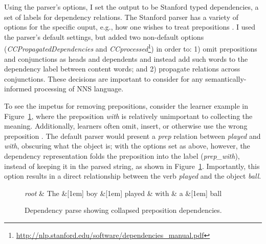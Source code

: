 Using the parser's options, I set the output to be Stanford typed dependencies, a set of labels for dependency relations. The Stanford parser has a variety of options for the specific ouput, e.g., how one wishes to treat prepositions \citep{defmarneffe:manning:12}.  I used the parser's default settings, but added two non-default options (\textit{CCPropagatedDependencies} and \textit{CCprocessed}\footnote{\url{http://nlp.stanford.edu/software/dependencies_manual.pdf}}) in order to: 1) omit prepositions and conjunctions as heads and dependents and instead add such words to the dependency label between content words; and 2) propagate relations across conjunctions.  These decisions are important to consider for any semantically-informed processing of NNS language.

To see the impetus for removing prepositions, consider the learner
example in Figure~\ref{fig:prep-dependency}, where the preposition \textit{with} is
relatively unimportant to collecting the meaning.  Additionally,
learners often omit, insert, or otherwise use the wrong preposition
\citep{chodorow:et:al:07}.  The default parser would present a
\textit{prep} relation between \textit{played} and \textit{with},
obscuring what the object is; with the options set as above, however,
the dependency representation folds the preposition into the label
(\textit{prep\_with}), instead of keeping it in the parsed string, as
shown in Figure~\ref{fig:prep-dependency}. Importantly, this option results in a direct relationship between the verb \textit{played} and the object \textit{ball}.

\begin{figure}[htb!]
\begin{center}
    \begin{dependency}[arc edge,text only label,label style={above}]
    \begin{deptext}[column sep=.5em]
      \textit{root} \& The \&[1em] boy \&[1em] played \& with \& a \&[1em] ball \\
    \end{deptext}
  \end{dependency}
\end{center}
\caption{Dependency parse showing collapsed preposition dependencies.}
\label{fig:prep-dependency}
\end{figure}

